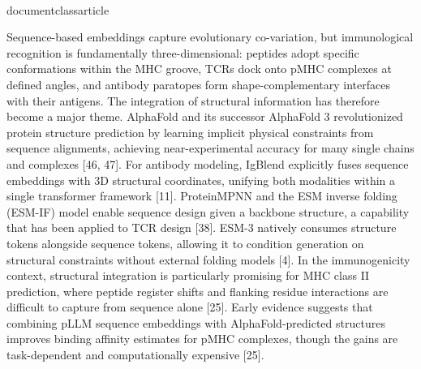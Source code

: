 \\documentclass{article}
\begin{document}
Sequence-based embeddings capture evolutionary co-variation, but immunological recognition is fundamentally three-dimensional: peptides adopt specific conformations within the MHC groove, TCRs dock onto pMHC complexes at defined angles, and antibody paratopes form shape-complementary interfaces with their antigens. The integration of structural information has therefore become a major theme. AlphaFold and its successor AlphaFold 3 revolutionized protein structure prediction by learning implicit physical constraints from sequence alignments, achieving near-experimental accuracy for many single chains and complexes [46, 47]. For antibody modeling, IgBlend explicitly fuses sequence embeddings with 3D structural coordinates, unifying both modalities within a single transformer framework [11]. ProteinMPNN and the ESM inverse folding (ESM-IF) model enable sequence design given a backbone structure, a capability that has been applied to TCR design [38]. ESM-3 natively consumes structure tokens alongside sequence tokens, allowing it to condition generation on structural constraints without external folding models [4]. In the immunogenicity context, structural integration is particularly promising for MHC class II prediction, where peptide register shifts and flanking residue interactions are difficult to capture from sequence alone [25]. Early evidence suggests that combining pLLM sequence embeddings with AlphaFold-predicted structures improves binding affinity estimates for pMHC complexes, though the gains are task-dependent and computationally expensive [25].

\section{}

\subsection{}
\end{document}
